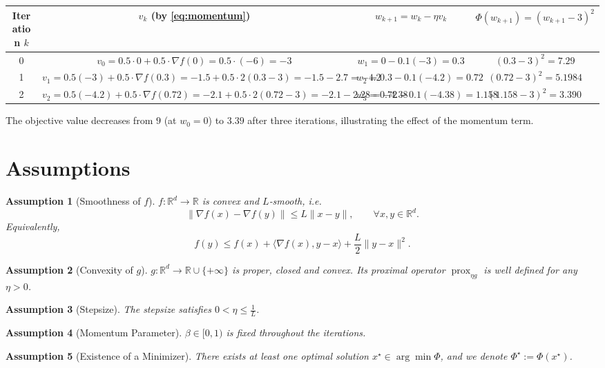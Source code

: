 \documentclass{article}
\newtheorem{assumption}{Assumption}
\newcommand{\prox}{\operatorname{prox}}
\newcommand{\grad}{\nabla}
\newcommand{\R}{\mathbb{R}}
\begin{document}
\begin{center}
\begin{tabular}{c|c|c|c}
Iteration $k$ & $v_{k}$ (by \eqref{eq:momentum}) & $w_{k+1}=w_{k}-\eta v_{k}$ & $\Phi(w_{k+1})=(w_{k+1}-3)^{2}$\\ \hline
0 & $v_{0}=0.5\cdot0+0.5\cdot\grad f(0)=0.5\cdot(-6)=-3$ & $w_{1}=0-0.1(-3)=0.3$ & $(0.3-3)^{2}=7.29$\\[4pt]
1 & $v_{1}=0.5(-3)+0.5\cdot\grad f(0.3)= -1.5+0.5\cdot2(0.3-3)=-1.5-2.7=-4.2$ & $w_{2}=0.3-0.1(-4.2)=0.72$ & $(0.72-3)^{2}=5.1984$\\[4pt]
2 & $v_{2}=0.5(-4.2)+0.5\cdot\grad f(0.72)= -2.1+0.5\cdot2(0.72-3)= -2.1-2.28=-4.38$ & $w_{3}=0.72-0.1(-4.38)=1.158$ & $(1.158-3)^{2}=3.390\,$
\end{tabular}
\end{center}
The objective value decreases from $9$ (at $w_{0}=0$) to $3.39$ after three iterations, illustrating the effect of the momentum term.

\newpage
\section*{Assumptions}
\begin{assumption}[Smoothness of $f$]\label{asm:smooth}
$f:\R^{d}\to\R$ is convex and $L$‑smooth, i.e.
\[
\|\grad f(x)-\grad f(y)\|\le L\|x-y\|,\qquad\forall x,y\in\R^{d}.
\]
Equivalently,
\[
f(y)\le f(x)+\langle\grad f(x),y-x\rangle+\frac{L}{2}\|y-x\|^{2}.
\]
\end{assumption}
\begin{assumption}[Convexity of $g$]\label{asm:gconvex}
$g:\R^{d}\to\R\cup\{+\infty\}$ is proper, closed and convex. Its proximal operator $\prox_{\eta g}$ is well defined for any $\eta>0$.
\end{assumption}
\begin{assumption}[Stepsize]\label{asm:stepsize}
The stepsize satisfies $0<\eta\le \frac{1}{L}$.
\end{assumption}
\begin{assumption}[Momentum Parameter]\label{asm:beta}
$\beta\in[0,1)$ is fixed throughout the iterations.
\end{assumption}
\begin{assumption}[Existence of a Minimizer]\label{asm:solution}
There exists at least one optimal solution $x^{\star}\in\arg\min\Phi$, and we denote $\Phi^{\star}:=\Phi(x^{\star})$.
\end{assumption}
\end{document}
